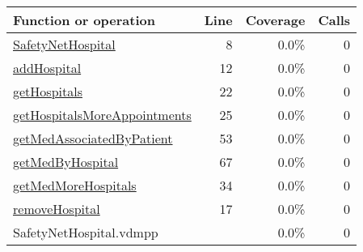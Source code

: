\bigskip
\begin{longtable}{|l|r|r|r|}
\hline
Function or operation & Line & Coverage & Calls \\
\hline
\hline
\hyperref[SafetyNetHospital:8]{SafetyNetHospital} & 8&0.0\% & 0 \\
\hline
\hyperref[addHospital:12]{addHospital} & 12&0.0\% & 0 \\
\hline
\hyperref[getHospitals:22]{getHospitals} & 22&0.0\% & 0 \\
\hline
\hyperref[getHospitalsMoreAppointments:25]{getHospitalsMoreAppointments} & 25&0.0\% & 0 \\
\hline
\hyperref[getMedAssociatedByPatient:53]{getMedAssociatedByPatient} & 53&0.0\% & 0 \\
\hline
\hyperref[getMedByHospital:67]{getMedByHospital} & 67&0.0\% & 0 \\
\hline
\hyperref[getMedMoreHospitals:34]{getMedMoreHospitals} & 34&0.0\% & 0 \\
\hline
\hyperref[removeHospital:17]{removeHospital} & 17&0.0\% & 0 \\
\hline
\hline
SafetyNetHospital.vdmpp & & 0.0\% & 0 \\
\hline
\end{longtable}

